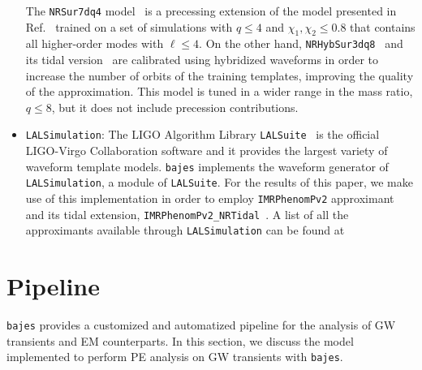 \documentclass[prd,aps,twocolumn,a4paper,showkeys,nofootinbib,floatfix]{revtex4-1}
\newcommand{\bajes}{{\tt bajes}}
\begin{document}
\begin{itemize}
	The {\tt NRSur7dq4} model~\cite{Varma:2019csw} is
	a precessing extension of the model presented in Ref.~\cite{Blackman:2017pcm}
	trained on a set of simulations with $q \le 4$ and $\chi_1,\chi_2\le 0.8$ 
	that contains all higher-order modes with $\ell\le 4$.
	On the other hand, {\tt NRHybSur3dq8}~\cite{Varma:2018mmi}
	and its tidal version~\cite{Barkett:2019tus} are calibrated using hybridized waveforms in order to increase 
	the number of orbits of the training templates, 
	improving the quality of the approximation.
	This model is tuned in a wider range in the mass ratio, $q \le 8$,
	but it does not include precession contributions.
	\item {\tt LALSimulation}: 
	The LIGO Algorithm Library {\tt LALSuite}~\cite{lalsuite}
	is the official LIGO-Virgo Collaboration software and it provides 
	the largest variety of waveform template models.
	{\bajes} implements the waveform generator 
	of {\tt LALSimulation}, a module of {\tt LALSuite}.
	For the results of this paper, we make use of this implementation
	in order to employ {\tt IMRPhenomPv2} approximant~\cite{Husa:2015iqa,Khan:2015jqa} 
	and its tidal extension, {\tt IMRPhenomPv2\_NRTidal}~\cite{Dietrich:2017aum}.
	A list of all the approximants available through {\tt LALSimulation} can be found at \cite{lal_approximants}
\end{itemize}

\section{Pipeline} 
\label{sec:pipe}

{\bajes} provides a customized 
and automatized pipeline for the 
analysis of GW transients and EM counterparts.
In this section, we discuss the model implemented to 
perform PE analysis on GW transients
with {\bajes}.
\end{document}
